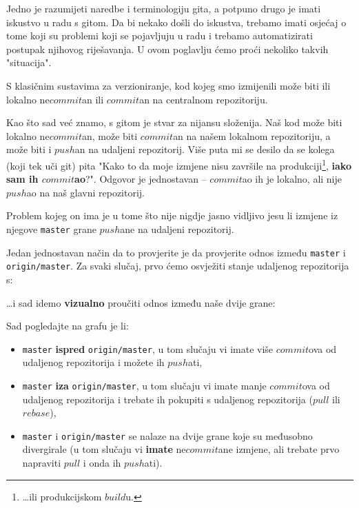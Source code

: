 
Jedno je razumijeti naredbe i terminologiju gita, a potpuno drugo je imati iskustvo u radu s gitom.
Da bi nekako došli do iskustva, trebamo imati osjećaj o tome koji su problemi koji se pojavljuju u radu i trebamo automatizirati postupak njihovog riješavanja.
U ovom poglavlju ćemo proći nekoliko takvih "situacija".


S klasičnim sustavima za verzioniranje, kod kojeg smo izmijenili može biti ili lokalno ne$commit$an ili $commit$an na centralnom repozitoriju.

Kao što sad već znamo, s gitom je stvar za nijansu složenija.
Naš kod može biti lokalno ne$commit$an, može biti $commit$an na našem lokalnom repozitoriju, a može biti i $push$an na udaljeni repozitorij.
Više puta mi se desilo da se kolega (koji tek uči git) pita "Kako to da moje izmjene nisu završile na produkciji\footnote{\dots{}ili produkcijskom $build$u.}, \textbf{iako sam ih $commit$ao}?".
Odgovor je jednostavan -- $commit$ao ih je lokalno, ali nije $push$ao na naš glavni repozitorij.

Problem kojeg on ima je u tome što nije nigdje jasno vidljivo jesu li izmjene iz njegove \verb+master+ grane $push$ane na udaljeni repozitorij.

Jedan jednostavan način da to provjerite je da provjerite odnos između \verb+master+ i \verb+origin/master+.
Za svaki slučaj, prvo ćemo osvježiti stanje udaljenog repozitorija s:


\dots{}i sad idemo \textbf{vizualno} proučiti odnos između naše dvije grane:


Sad pogledajte na grafu je li:
\begin{itemize}
    \item \verb+master+ \textbf{ispred} \verb+origin/master+, u tom slučaju vi imate više $commit$ova od udaljenog repozitorija i možete ih $push$ati,
    \item \verb+master+ \textbf{iza} \verb+origin/master+, u tom slučaju vi imate manje $commit$ova od udaljenog repozitorija i trebate ih pokupiti s udaljenog repozitorija ($pull$ ili $rebase$),
    \item \verb+master+ i \verb+origin/master+ se nalaze na dvije grane koje su međusobno divergirale (u tom slučaju vi \textbf{imate} ne$commit$ane izmjene, ali trebate prvo napraviti $pull$ i onda ih $push$ati).
\end{itemize}

